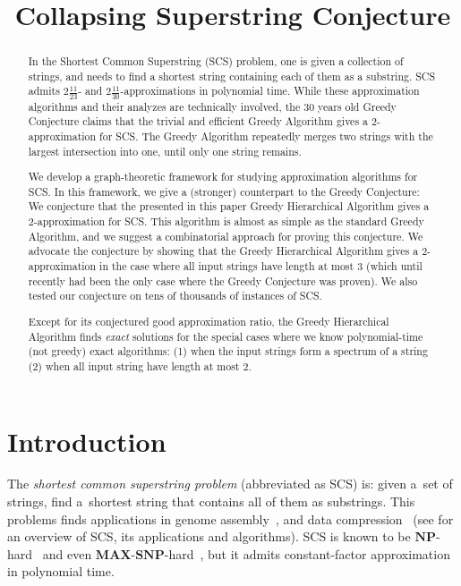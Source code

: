 \documentclass[11pt]{article}
\begin{document}
%

\sloppy
\date{}
\title{Collapsing Superstring Conjecture}
\author{}
\maketitle

\begin{abstract}
In the Shortest Common Superstring (SCS) problem, one is given a collection of strings, and needs to find a shortest string containing each of them as a substring. SCS admits $2\frac{11}{23}$- and $2\frac{11}{30}$-approximations in polynomial time. While these approximation algorithms and their analyzes are technically involved, the $30$ years old Greedy Conjecture claims that the trivial and efficient Greedy Algorithm gives a $2$-approximation for SCS. The Greedy Algorithm repeatedly merges two strings with the largest intersection into one, until only one string remains.

We develop a graph-theoretic framework for studying approximation algorithms for SCS. In this framework, we give a (stronger) counterpart to the Greedy Conjecture: We conjecture that the presented in this paper Greedy Hierarchical Algorithm gives a $2$-approximation for SCS. This algorithm is almost as simple as the standard Greedy Algorithm, and we suggest a combinatorial approach for proving this conjecture. We advocate the conjecture by showing that the Greedy Hierarchical Algorithm gives a $2$-approximation in the case where all input strings have length at most $3$ (which until recently had been the only case where the Greedy Conjecture was proven). We also tested our conjecture on tens of thousands of instances of SCS.

Except for its conjectured good approximation ratio, the Greedy Hierarchical Algorithm finds \emph{exact} solutions for the special cases where we know polynomial-time (not greedy) exact algorithms: (1) when the input strings form a spectrum of a string (2) when all input string have length at most $2$.
\end{abstract}


\section{Introduction}
\label{sec:intro}
The {\em shortest common superstring problem} (abbreviated as SCS) is:
given a~set of strings, find a~shortest string that contains all of them as
substrings. This problems finds applications in genome assembly~\cite{waterman1995introduction, pevzner2001eulerian}, and data compression~\cite{GMS1980, phdthesis, storer1987data} (see \cite{gevezes2014shortest, mucha2007tutorial} for an overview of SCS, its applications and algorithms).  SCS is known to be $\mathbf{NP}$-hard~\cite{GMS1980} and even $\mathbf{MAX}$-$\mathbf{SNP}$-hard~\cite{BJLTY1991}, but it admits constant-factor approximation in polynomial time.
\end{document}

